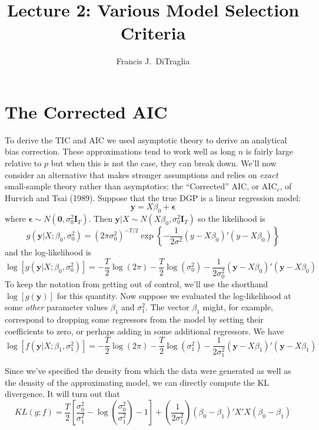 \documentclass[12pt]{article}
\theoremstyle{definition}
\begin{document}
\title{Lecture 2: Various Model Selection Criteria}

\author{Francis J.\ DiTraglia}

\maketitle 




\section{The Corrected AIC}
To derive the TIC and AIC we used asymptotic theory to derive an analytical bias correction. These approximations tend to work well as long $n$ is fairly large relative to $p$ but when this is not the case, they can break down. We'll now consider an alternative that makes stronger assumptions and relies on \emph{exact} small-sample theory rather than asymptotics: the ``Corrected'' AIC, or AIC$
_c$, of Hurvich and Tsai (1989). Suppose that the true DGP is a linear regression model:
$$\textbf{y} = X\beta_0 + \boldsymbol{\epsilon}$$
where $\mathbf{\epsilon} \sim N(\mathbf{0}, \sigma_0^2 \mathbf{I}_T)$. Then $\mathbf{y}|X \sim N(X\beta_0, \sigma_0^2 \mathbf{I}_T)$ so the likelihood is
$$g(\textbf{y}|X;\beta_0, \sigma^2_0) = \left(2\pi\sigma_0^2\right)^{-T/2} \exp\left\{ -\frac{1}{2\sigma^2}(y - X\beta_0)'(y - X\beta_0)\right\}$$
and the log-likelihood is
$$\log\left[g(\textbf{y}|X;\beta_0, \sigma_0^2)\right] = -\frac{T}{2}\log(2\pi) -\frac{T}{2} \log(\sigma^2_0) - \frac{1}{2\sigma_0^2}\left(\textbf{y} - X\beta_0\right)'\left(\textbf{y} -X\beta_0\right)$$
To keep the notation from getting out of control, we'll use the shorthand $\log[g(\mathbf{y})]$ for this quantity. Now suppose we evaluated the log-likelihood at some \emph{other} parameter values $\beta_1$ and $\sigma^2_1$. The vector $\beta_1$ might, for example, correspond to dropping some regressors from the model by setting their coefficients to zero, or perhaps adding in some additional regressors. We have
$$\log[f(\textbf{y}|X;\beta_1, \sigma_1^2)] = -\frac{T}{2}\log(2\pi) -\frac{T}{2} \log(\sigma^2_1) - \frac{1}{2\sigma_1^2}\left(\textbf{y} - X\beta_1\right)'\left(\textbf{y} -X\beta_1\right)$$

Since we've specified the density from which the data were generated as well as the density of the approximating model, we can directly compute the KL divergence. It will turn out that
$$KL(g;f) = \frac{T}{2}\left[\frac{\sigma_0^2}{\sigma_1^2} - \log\left(\frac{\sigma_0^2}{\sigma_1^2}\right) - 1 \right] + \left(\frac{1}{2 \sigma_1^2}\right)\left(\beta_0 - \beta_1\right)'X'X\left(\beta_0 - \beta_1\right)$$
\end{document}
